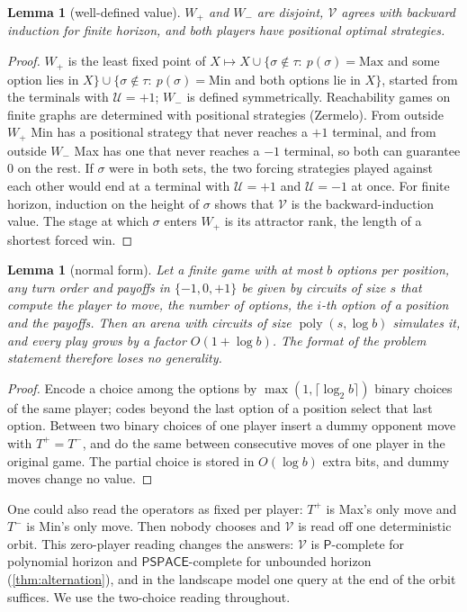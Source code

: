 \documentclass[11pt]{amsart}
\theoremstyle{plain}
\newtheorem{lemma}[theorem]{Lemma}
\theoremstyle{definition}
\theoremstyle{remark}
\numberwithin{equation}{section}
\newcommand{\val}{\mathcal{V}}            %
\newcommand{\pay}{\mathcal{U}}            %
\newcommand{\poly}{\operatorname{poly}}
\newcommand{\cls}[1]{\mathsf{#1}}
\newcommand{\PSPACE}{\cls{PSPACE}}
\newcommand{\Pclass}{\cls{P}}
\begin{document}
\begin{lemma}[well-defined value]\label{lem:well-defined}
$W_{+}$ and $W_{-}$ are disjoint, $\val$ agrees with backward induction for finite horizon, and both players have positional optimal strategies.
\end{lemma}

\begin{proof}
$W_{+}$ is the least fixed point of $X\mapsto X\cup\{\sigma\notin\tau:\ p(\sigma)=\mathrm{Max}$ and some option lies in $X\}\cup\{\sigma\notin\tau:\ p(\sigma)=\mathrm{Min}$ and both options lie in $X\}$, started from the terminals with $\pay=+1$; $W_{-}$ is defined symmetrically. Reachability games on finite graphs are determined with positional strategies (Zermelo). From outside $W_{+}$ Min has a positional strategy that never reaches a $+1$ terminal, and from outside $W_{-}$ Max has one that never reaches a $-1$ terminal, so both can guarantee $0$ on the rest. If $\sigma$ were in both sets, the two forcing strategies played against each other would end at a terminal with $\pay=+1$ and $\pay=-1$ at once. For finite horizon, induction on the height of $\sigma$ shows that $\val$ is the backward-induction value. The stage at which $\sigma$ enters $W_{+}$ is its attractor rank, the length of a shortest forced win.
\end{proof}

\begin{lemma}[normal form]\label{lem:normal-form}
Let a finite game with at most $b$ options per position, any turn order and payoffs in $\{-1,0,+1\}$ be given by circuits of size $s$ that compute the player to move, the number of options, the $i$-th option of a position and the payoffs. Then an arena with circuits of size $\poly(s,\log b)$ simulates it, and every play grows by a factor $O(1+\log b)$. The format of the problem statement therefore loses no generality.
\end{lemma}

\begin{proof}
Encode a choice among the options by $\max(1,\lceil\log_2 b\rceil)$ binary choices of the same player; codes beyond the last option of a position select that last option. Between two binary choices of one player insert a dummy opponent move with $T^{+}=T^{-}$, and do the same between consecutive moves of one player in the original game. The partial choice is stored in $O(\log b)$ extra bits, and dummy moves change no value.
\end{proof}

One could also read the operators as fixed per player: $T^{+}$ is Max's only move and $T^{-}$ is Min's only move. Then nobody chooses and $\val$ is read off one deterministic orbit. This zero-player reading changes the answers: $\val$ is $\Pclass$-complete for polynomial horizon and $\PSPACE$-complete for unbounded horizon (\cref{thm:alternation}), and in the landscape model one query at the end of the orbit suffices. We use the two-choice reading throughout.
\end{document}
